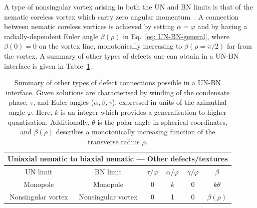 A type of nonsingular vortex arising in both the UN and BN limits is that of the
nematic coreless vortex which carry zero angular
momentum~\cite{Choi2012, Lovegrove2014}.
A connection between nematic coreless vortices is achieved by setting
\(\alpha=\varphi \) and by having a radially-dependent Euler angle
\(\beta(\rho)\) in Eq.~\eqref{eq: UN-BN-general}, where \(\beta(0)=0\)
on the vortex line, monotonically increasing to \(\beta(\rho=\pi/2)\) far from
the vortex.
A summary of other types of defects one can obtain in a UN-BN interface is
given in Table~\ref{tab: UN-BN-nonsingular}.
\begin{table}
    \centering
    \begin{tabular}{cccccc}
        \toprule
        \multicolumn{6}{c}{Uniaxial nematic to biaxial nematic ---
        Other defects/textures} \\
        \midrule
        UN limit & BN limit &  \(\tau/\varphi \) & \(\alpha/\varphi \) &
        \(\gamma/\varphi \) & \(\beta \) \\
        \midrule
        Monopole & Monopole & 0 & \(k\)  & 0 & \(k\theta \) \\
        Nonsingular vortex & Nonsingular vortex & 0 & 1 & 0 &
        \(\beta(\rho)\) \\ 
        \bottomrule
    \end{tabular}
    \caption{\label{tab: UN-BN-nonsingular}
    Summary of other types of defect connections possible in a UN-BN interface.
    Given solutions are characterised by winding of the condensate phase,
    \(\tau \), and Euler angles (\(\alpha, \beta, \gamma \)), expressed in units
    of the azimuthal angle \(\varphi \).
    Here, \(k\) is an integer which provides a generalisation to higher
    quantisation.
    Additionally, \(\theta \) is the polar angle in spherical coordinates, and
    \(\beta(\rho)\) describes a monotonically increasing function of the
    transverse radius \(\rho \).}
\end{table}

